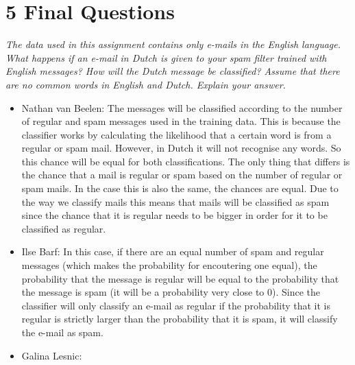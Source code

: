 \documentclass{article}
\begin{document}
\section*{5 Final Questions}
\textit{The  data  used  in  this  assignment  contains  only  e-mails  in  the  English  language.
What happens if an e-mail in Dutch is given to your spam filter trained with English messages?
How  will  the  Dutch  message  be  classified?   Assume  that  there  are  no  common  words  in
English and Dutch.  Explain your answer.}
\begin{itemize}
    \item Nathan van Beelen: The messages will be classified according to the number of
          regular and spam messages used in the training data.
          This is because the classifier works by calculating the likelihood that a
          certain word is from a regular or spam mail. However, in Dutch it will not
          recognise any words. So this chance will be equal for both classifications.
          The only thing that differs is the chance that a mail is regular or spam based
          on the number of regular or spam mails. In the case this is also the same,
          the chances are equal. Due to the way we classify mails this means that
          mails will be classified as spam since the chance that it is regular needs
          to be bigger in order for it to be classified as regular.
    \item Ilse Barf: In this case, if there are an equal number of spam and regular messages
          (which makes the probability for encoutering one equal), the probability that the
          message is regular will be equal to the probability that the message is spam (it will be
          a probability very close to 0).
          Since the classifier will only classify an e-mail as regular if the probability that it
          is regular is strictly larger than the probability that it is spam, it will classify the
          e-mail as spam.
    \item Galina Lesnic:
\end{itemize}
\end{document}
